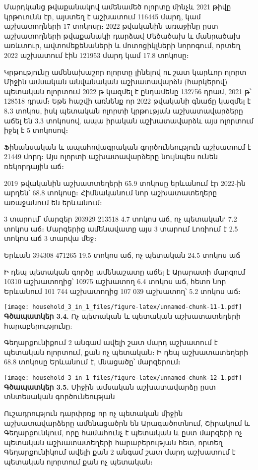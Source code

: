 \documentclass[
]{article}
\begin{document}
Մարդկանց թվաքանակով ամենամեծ ոլորտը մինչև 2021 թիվը կրթուունն էր, այստեղ
է աշխատում 116445 մարդ, կամ աշխատողների 17 տոկոսը։ 2022 թվականին առաջինը
ըստ աշխատողների թվաքանակի դարձավ Մեծածախ և մանրածախ առևտուր,
ավտոմեքենաների և մոտոցիկլների նորոգում, որտեղ 2022 աշխատում էին 121953
մարդ կամ 17.8 տոկոսը։

Կրթությունը ամենախաշոր ոլորտը լինելով ու շատ կարևոր ոլորտ Միջին ամսական
անվանական աշխատավարձն (հարկերով) պետական ոլորտում 2022 թ կազմել է
ընդամենը 132756 դրամ, 2021 թ՝ 128518 դրամ։ Եթե հաշվի առնենք որ 2022
թվականի գնաճը կազմել է 8․3 տոկոս, իսկ պետական ոլորտի կրթության
աշխատավարձերը աճել են 3.3 տոկոսով, ապա իրական աշխատավարձև այս ոլորտում
իջել է 5 տոկոսով։

Ֆինանսական և ապահովագրական գործունեություն աշխատում է 21449 մորդ։ Այս
ոլորտի աշխատավարձերը նույնպես ունեն ռեկորդային աճ։

2019 թվականին աշխատտեղերի 65.9 տոկոսը երևանում էր 2022-ին արդեն՝ 68.8
տոկոսը։ Հիմնականում նոր աշխատատեղերը առաջանում են երևանում։

3 տարում՝ մարզեր 203929 213518 4.7 տոկոս աճ, ոչ պետական` 7.2 տոկոս աճ։
Մարզերից ամենավատը այս 3 տարում Լոռիում է 2.5 տոկոս աճ 3 տարվա մեջ։

Երևան 394308 471265 19.5 տոկոս աճ, ոչ պետական 24.5 տոկոս աճ

Ի դեպ պետական գործը ամենաշատը աճել է Արարատի մարզում 10310 աշխատողից՝
10975 աշխատող 6.4 տոկոս աճ, հետո նոր Երևանում 101 744 աշխատողից 107 039
աշխատող՝ 5.2 տոկոս աճ։

\texttt{[image: household\_3\_in\_1\_files/figure-latex/unnamed-chunk-11-1.pdf]}
\textbf{Գծապատկեր 3.4.} Ոչ պետական և պետական աշխատատեղերի
հարաբերությունը:

Գեղարքունիքում 2 անգամ ավելի շատ մարդ աշխատում է պետական ոլորտում, քան
ոչ պետական։ Ի դեպ աշխատատեղերի 68.8 տոկոսը Երևանում է, մնացածը՝
մարզերում։

\texttt{[image: household\_3\_in\_1\_files/figure-latex/unnamed-chunk-12-1.pdf]}
\textbf{Գծապատկեր 3.5.} Միջին ամսական աշխատավարձը ըստ տնտեսական
գործունեության

Ուշադրություն դարփրռք որ ոչ պետական միջին աշխատավարձերը ամենացածրն են
Արագածոտնում, Շիրակում և Գեղարքունկում, որը համահունչ է պետական և ըստ
մարզերի ոչ պետական աշխատատեղերի հարաբերության հետ, որտեղ Գեղարքունիկում
ավելի քան 2 անգամ շատ մարդ աշխատում է պետական ոլորտում քան ոչ պետական։
\end{document}
